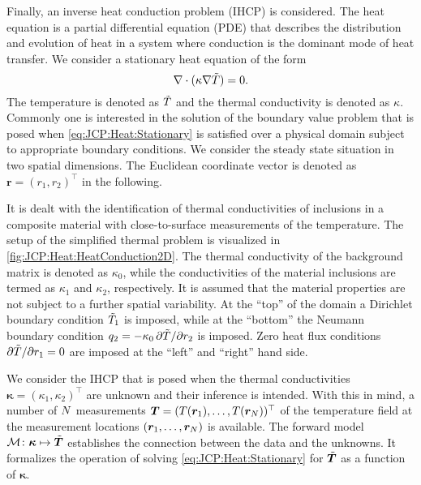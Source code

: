 Finally, an inverse heat conduction problem (IHCP) is considered.
The heat equation is a partial differential equation (PDE) that describes the distribution and evolution of heat in a system where conduction is the dominant mode of heat transfer.
We consider a stationary heat equation of the form
\begin{equation} \label{eq:JCP:Heat:Stationary}
  \nabla \cdot (\kappa \nabla \tilde{T}) = 0.
\end{equation}
The temperature is denoted as \(\tilde{T}\) and the thermal conductivity is denoted as \(\kappa\).
Commonly one is interested in the solution of the boundary value problem that is posed when \cref{eq:JCP:Heat:Stationary} is satisfied over a physical domain subject to appropriate boundary conditions.
We consider the steady state situation in two spatial dimensions.
The Euclidean coordinate vector is denoted as \(\bm{r} = (r_1,r_2)^\top\) in the following.
\par %
It is dealt with the identification of thermal conductivities of inclusions in a composite material with close-to-surface measurements of the temperature.
The setup of the simplified thermal problem is visualized in \cref{fig:JCP:Heat:HeatConduction2D}.
The thermal conductivity of the background matrix is denoted as \(\kappa_0\), while the conductivities of the material inclusions are termed as \(\kappa_1\) and \(\kappa_2\), respectively.
It is assumed that the material properties are not subject to a further spatial variability.
At the ``top'' of the domain a Dirichlet boundary condition \(\tilde{T}_1\) is imposed,
while at the ``bottom'' the Neumann boundary condition \(q_2 = - \kappa_0 \, \partial \tilde{T} / \partial r_2\) is imposed.
Zero heat flux conditions \(\partial \tilde{T} / \partial r_1 = 0\) are imposed at the ``left'' and ``right'' hand side.
\par %
We consider the IHCP that is posed when the thermal conductivities \(\bm{\kappa} = (\kappa_1,\kappa_2)^\top\) are unknown and their inference is intended.
With this in mind, a number of \(N\) measurements \(\bm{T} = (T(\bm{r}_1),\ldots,T(\bm{r}_N))^\top\)
of the temperature field at the measurement locations \((\bm{r}_1,\ldots,\bm{r}_N)\) is available.
The forward model \(\mathcal{M} \colon \bm{\kappa} \mapsto \tilde{\bm{T}}\) establishes the connection between the data and the unknowns.
It formalizes the operation of solving \cref{eq:JCP:Heat:Stationary} for \(\tilde{\bm{T}}\) as a function of \(\bm{\kappa}\).
